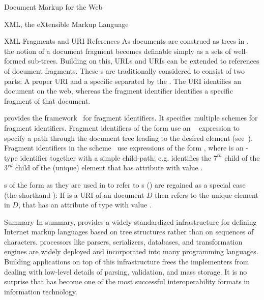 \begin{tchapter}[id=markup-web]{Document Markup for the Web}
\begin{tsection}[id=xml]{XML, the eXtensible Markup Language}
\begin{tsubsection}[id=xml-fragments]{XML Fragments and URI References}
  As documents are construed as trees in {\xml}, the notion of a document fragment becomes
  definable simply as a sets of well-formed sub-trees. Building on this, URLs and URIs can
  be extended to references of document fragments. These {s} are
  traditionally considered to consist of two parts: A proper URI and a specific
  {} separated by the {}
  {\snippet{\#}}. The URI identifies an {\xml} document on the web, whereas the fragment
  identifier identifies a specific fragment of that document.

  {\xml} provides the {\xpointer} framework~\cite{GroMal:xf03} for fragment
  identifiers. It specifies multiple schemes for fragment identifiers. Fragment
  identifiers of the form {} use an
  {\xpath}~\cite{ClaDeR:xpath99} expression {} to specify a path
  through the document tree leading to the desired element (see~\cite{DeRMal:xxs02}).
  Fragment identifiers in the {} scheme~\cite{GroMal:xes03} use
  expressions of the form {}, where
  {} is an {}-type identifier together
  with a simple child-path; e.g.  {} identifies the $7^{th}$
  child of the $3^{rd}$ child of the (unique) element that has {}
  attribute with value {}.

  {s} of the form {} as they
  are used in {\html} to refer to {s} ({}) are regained as a special case (the shorthand
  {}): If {} is a URI
  of an {\xml} document $D$ then {} refers to the
  unique element in $D$, that has an attribute of type {} with
  value {}.
\end{tsubsection}

\begin{tsubsection}[id=xml-summary]{Summary}
  In summary, {\xml} provides a widely standardized infrastructure for defining Internet
  markup languages based on tree structures rather than on sequences of characters. {\xml}
  processors like parsers, serializers, {\xml} databases, and {\xslt} transformation
  engines are widely deployed and incorporated into many programming languages. Building
  {\xml} applications on top of this infrastructure frees the implementers from dealing
  with low-level details of parsing, validation, and mass storage. It is no surprise that
  {\xml} has become one of the most successful interoperability formats in information
  technology.


\end{tsubsection}
\end{tsection}
\end{tchapter}
